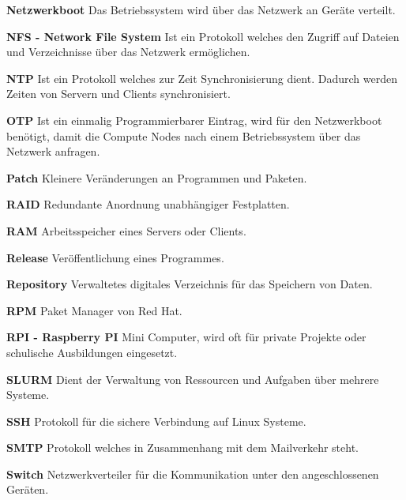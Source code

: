\textbf{Netzwerkboot}\newline
Das Betriebssystem wird über das Netzwerk an Geräte verteilt.

\textbf{NFS - Network File System}\newline
Ist ein Protokoll welches den Zugriff auf Dateien und Verzeichnisse über das Netzwerk ermöglichen.

\textbf{NTP}\newline
Ist ein Protokoll welches zur Zeit Synchronisierung dient. Dadurch werden Zeiten von Servern und Clients synchronisiert.

\textbf{OTP}\newline
Ist ein einmalig Programmierbarer Eintrag, wird für den Netzwerkboot benötigt, damit die Compute Nodes nach einem Betriebssystem über das Netzwerk anfragen.

\textbf{Patch}\newline
Kleinere Veränderungen an Programmen und Paketen.

\textbf{RAID}\newline
Redundante Anordnung unabhängiger Festplatten.

\textbf{RAM}\newline
Arbeitsspeicher eines Servers oder Clients.

\textbf{Release}\newline
Veröffentlichung eines Programmes.

\textbf{Repository}\newline
Verwaltetes digitales Verzeichnis für das Speichern von Daten.

\textbf{RPM}\newline
Paket Manager von Red Hat.

\textbf{RPI - Raspberry PI}\newline
Mini Computer, wird oft für private Projekte oder schulische Ausbildungen eingesetzt.

\textbf{SLURM}\newline
Dient der Verwaltung von Ressourcen und Aufgaben über mehrere Systeme.

\textbf{SSH}\newline
Protokoll für die sichere Verbindung auf Linux Systeme.

\textbf{SMTP}\newline
Protokoll welches in Zusammenhang mit dem Mailverkehr steht.

\textbf{Switch}\newline
Netzwerkverteiler für die Kommunikation unter den angeschlossenen Geräten.

